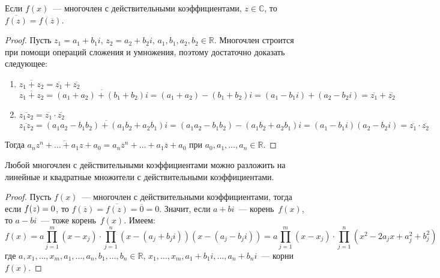 \begin{lemma}
Если $f(x)$~--- многочлен с действительными коэффициентами, $z \in \mathbb C$, то $\overline{f(z)} = f(\overline z)$.
\end{lemma}
\begin{proof}
Пусть $z_1 = a_1 + b_1 i$, $z_2 = a_2 + b_2 i$, $a_1, b_1, a_2, b_2 \in \mathbb R$.
Многочлен строится при помощи операций сложения и умножения, поэтому достаточно доказать следующее:
\begin{enumerate}
	\item $\overline{z_1 + z_2} = \overline{z_1} + \overline{z_2}$
	\begin{equation*}
	\overline{z_1 + z_2} = \overline{(a_1 + a_2) + (b_1 + b_2)i} = (a_1 + a_2) - (b_1 + b_2)i =
	(a_1 - b_1 i) + (a_2 - b_2 i) = \overline{z_1} + \overline{z_2}
	\end{equation*}
	
	\item $\overline{z_1 z_2} = \overline{z_1} \cdot \overline{z_2}$
	\begin{equation*}
	\overline{z_1 z_2} = \overline{(a_1 a_2 - b_1 b_2) + (a_1 b_2 + a_2 b_1)i} =
	(a_1 a_2 - b_1 b_2) - (a_1 b_2 + a_2 b_1)i = (a_1 - b_1 i)(a_2 - b_2 i) =
	\overline{z_1} \cdot \overline{z_2}
	\end{equation*}
\end{enumerate}
Тогда $\overline{a_n z^n + \ldots + a_1 z + a_0} = a_n \overline z^n + \ldots + a_1 \overline z + a_0$ при $a_0, a_1, \ldots, a_n \in \mathbb R$.
\end{proof}

\begin{theorem}
\label{th:polynomial_factorization}
Любой многочлен с действительными коэффициентами можно разложить на линейные и квадратные множители с действительными коэффициентами.
\end{theorem}
\begin{proof}
Пусть $f(x)$~--- многочлен с действительными коэффициентами, тогда если $f(z) \opbr= 0$, то $f(\overline z) = \overline{f(z)} = \overline 0 = 0$.
Значит, если $a + bi$~--- корень~$f(x)$, то $a - bi$~--- тоже корень~$f(x)$.
Имеем:
\begin{equation*}
f(x) = a \prod_{j=1}^{m} (x - x_j) \cdot \prod_{j=1}^{n} (x - (a_j + b_j i))(x - (a_j - b_j i)) =
a \prod_{j=1}^{m} (x - x_j) \cdot \prod_{j=1}^{n} (x^2 - 2a_j x + a_j^2 + b_j^2)
\end{equation*}
где $a, x_1, \ldots, x_m, a_1, \ldots, a_n, b_1, \ldots, b_n \in \mathbb R$,
$x_1, \ldots, x_m, a_1 + b_1 i, \ldots, a_n + b_n i$~--- корни~$f(x)$.
\end{proof}


